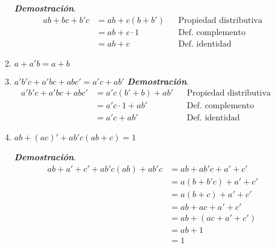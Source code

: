 \documentclass{report}
\begin{document}
\begin{enumerate}
\begin{enumerate}
            \textit{\textbf{Demostración}}.
            \begin{align*}
                ab + bc + b'c &= ab + c(b+b') && \text{Propiedad distributiva}\\
                &= ab + c\cdot 1 && \text{Def. complemento}\\
                &= ab + c && \text{Def. identidad}
            \end{align*}
            \item $a + a'b = a + b$
            \item $a'b'c + a'bc + abc' = a'c + ab'$
            \textit{\textbf{Demostración}}.
            \begin{align*}
                a'b'c + a'bc + abc' &= a'c(b'+b) + ab' && \text{Propiedad distributiva}\\
                &= a'c\cdot 1 + ab' && \text{Def. complemento}\\
                &= a'c + ab' && \text{Def. identidad}&&
            \end{align*}
            \item $ab + (ac)' + ab'c(ab + c) = 1$

            \textit{\textbf{Demostración}}.
            \begin{align*}
                ab + a' + c' + ab'c(ab) + ab'c &= ab + ab'c + a' +c'\\
                &= a(b+b'c)+a'+c'\\
                &= a(b+c)+a'+c'\\
                &= ab +ac +a' +c'\\
                &= ab+ (ac +a' +c')\\
                &= ab+1\\
                &= 1
            \end{align*}
        \end{enumerate}
    \end{enumerate}
\end{document}
